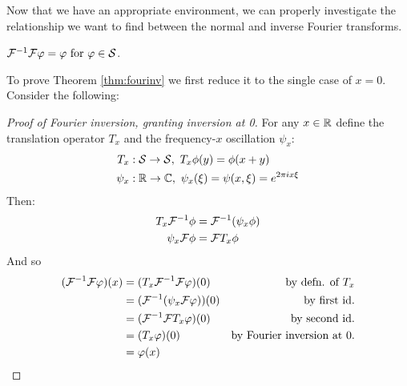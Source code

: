 \documentclass[thesis.tex]{subfiles}
\begin{document}
    Now that we have an appropriate environment, we can properly investigate the relationship we want to find between the normal and inverse Fourier transforms.
    \begin{thm}
      \label{thm:fourinv}
      $\mathcal{F}^{-1}\mathcal{F} \varphi = \varphi \text{ for } \varphi\in\mathcal{S}$.
    \end{thm}
    To prove Theorem \ref{thm:fourinv} we first reduce it to the single case of $x=0$.
    Consider the following:
    \begin{proof}[Proof of Fourier inversion, granting inversion at 0]
      For any $x\in\mathbb{R}$ define the translation operator $T_x$ and the frequency-$x$ oscillation $\psi_x$:
      \begin{align*}
        T_x&:\mathcal{S}\rightarrow\mathcal{S},\ T_x\phi(y) = \phi(x+y)\\
        \psi_x&:\mathbb{R}\rightarrow\mathbb{C},\ \psi_x(\xi) = \psi(x,\xi) = e^{2\pi i x \xi}
      \end{align*}
      Then: 
      \begin{align*}
        T_x\mathcal{F}^{-1}\phi &= \mathcal{F}^{-1}(\psi_x\phi)\\
        \psi_x\mathcal{F}\phi &= \mathcal{F} T_x\phi
      \end{align*}
      And so
      \begin{align*}
        (\mathcal{F}^{-1}\mathcal{F}\varphi)(x) &= (T_x\mathcal{F}^{-1}\mathcal{F}\varphi)(0) &\text{by defn. of $T_x$}\\
        &= (\mathcal{F}^{-1}(\psi_x\mathcal{F}\varphi))(0) &\text{by first id.}\\
        &= (\mathcal{F}^{-1}\mathcal{F} T_x\varphi)(0)  &\text{by second id.}\\
        &= (T_x\varphi)(0) &\text{by Fourier inversion at 0.}\\
        &= \varphi(x)&\qedhere
      \end{align*}
    \end{proof}
\end{document}
